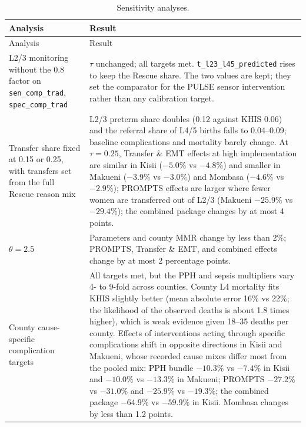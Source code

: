 \documentclass[11pt]{article}
\newcommand{\p}[1]{\texttt{#1}}
\begin{document}
\begin{longtable}{>{\raggedright\arraybackslash}p{} >{\raggedright\arraybackslash}p{}}
\caption{Sensitivity analyses.}\label{tab:sensitivity}\\
\toprule
Analysis & Result \\
\midrule
\endfirsthead
\toprule
Analysis & Result \\
\midrule
\endhead
L2/3 monitoring without the 0.8 factor on \p{sen\_comp\_trad}, \p{spec\_comp\_trad} & $\tau$ unchanged; all targets met. \p{t\_l23\_l45\_predicted} rises to keep the Rescue share. The two values are kept; they set the comparator for the PULSE sensor intervention rather than any calibration target. \\
Transfer share fixed at 0.15 or 0.25, with transfers set from the full Rescue reason mix & L2/3 preterm share doubles (0.12 against KHIS 0.06) and the referral share of L4/5 births falls to 0.04--0.09; baseline complications and mortality barely change. At $\tau=0.25$, Transfer \& EMT effects at high implementation are similar in Kisii ($-5.0\%$ vs $-4.8\%$) and smaller in Makueni ($-3.9\%$ vs $-3.0\%$) and Mombasa ($-4.6\%$ vs $-2.9\%$); PROMPTS effects are larger where fewer women are transferred out of L2/3 (Makueni $-25.9\%$ vs $-29.4\%$); the combined package changes by at most 4 points. \\
$\theta=2.5$ & Parameters and county MMR change by less than 2\%; PROMPTS, Transfer \& EMT, and combined effects change by at most 2 percentage points. \\
County cause-specific complication targets & All targets met, but the PPH and sepsis multipliers vary 4- to 9-fold across counties. County L4 mortality fits KHIS slightly better (mean absolute error 16\% vs 22\%; the likelihood of the observed deaths is about 1.8 times higher), which is weak evidence given 18--35 deaths per county. Effects of interventions acting through specific complications shift in opposite directions in Kisii and Makueni, whose recorded cause mixes differ most from the pooled mix: PPH bundle $-10.3\%$ vs $-7.4\%$ in Kisii and $-10.0\%$ vs $-13.3\%$ in Makueni; PROMPTS $-27.2\%$ vs $-31.0\%$ and $-25.9\%$ vs $-19.3\%$; the combined package $-64.9\%$ vs $-59.9\%$ in Kisii. Mombasa changes by less than 1.2 points. \\

\end{longtable}
\end{document}
